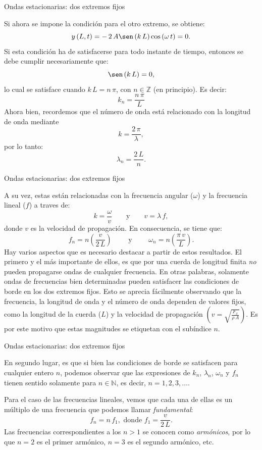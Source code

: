 \documentclass[11pt,handout,aspectratio=1610]{beamer}
\newcommand{\zz}{\mathbb{Z}}
\newcommand{\nn}{\mathbb{N}}
\newcommand{\vs}{\vspace{11pt}}
\begin{document}
\begin{frame}{Ondas estacionarias: dos extremos fijos}   
    
    Si ahora se impone la condición para el otro extremo, se obtiene: $$ y \left(L,t\right) = - \, 2 \, A \sen \left(k \, L\right) \cos \left(\omega \, t\right) = 0. $$ Si esta condición ha de satisfacerse para todo instante de tiempo, entonces se debe cumplir necesariamente que: $$ \sen \left(k \, L\right) = 0, $$ lo cual se satisface cuando $ k \, L = n \, \pi $, con $ n \in \zz $ (en principio). Es decir: $$ k_n = \frac{n \, \pi}{L} $$  Ahora bien, recordemos que el número de onda está relacionado con la longitud de onda mediante $$ k = \frac{2 \, \pi}{\lambda}, $$ por lo tanto: $$ \lambda_n = \frac{2 \, L}{n}. $$
    
\end{frame}

\begin{frame}{Ondas estacionarias: dos extremos fijos}

   A su vez, estas están relacionadas con la frecuencia angular ($\omega$) y la frecuencia lineal ($f$) a traves de: $$ k = \frac{\omega}{v} \qquad \text{y} \qquad v = \lambda \, f, $$ donde $v$ es la velocidad de propagación. En consecuencia, se tiene que: $$ f_n = n \left(\frac{v}{2 \, L}\right) \qquad \text{ y } \qquad \omega_n = n \left(\frac{\pi \, v}{L}\right). $$ Hay varios aspectos que es necesario destacar a partir de estos resultados. El primero y el más importante de ellos, es que por una cuerda de longitud finita \emph{no} pueden propagarse ondas de cualquier frecuencia. En otras palabras, solamente ondas de frecuencias bien determinadas pueden satisfacer las condiciones de borde en los dos extremos fijos. Esto se aprecia fácilmente observando que la frecuencia, la longitud de onda y el número de onda dependen de valores fijos, como la longitud de la cuerda ($L$) y la velocidad de propagación $\left(v = \sqrt{\frac{F_x}{\rho \, A}}\right)$. Es por este motivo que estas magnitudes se etiquetan con el subíndice $n$.
    
\end{frame}

\begin{frame}{Ondas estacionarias: dos extremos fijos}

    En segundo lugar, es que si bien las condiciones de borde se satisfacen para cualquier entero $n$, podemos observar que las expresiones de $k_n$, $\lambda_n$, $\omega_n$ y $f_n$ tienen sentido solamente para $n \in \nn $, es decir, $n = 1, 2, 3, \ldots$.

    \vs 

    Para el caso de las frecuencias lineales, vemos que cada una de ellas es un múltiplo de una frecuencia que podemos llamar \emph{fundamental}: $$ f_n = n \, f_1, \text{ donde } f_1 = \frac{v}{2 \, L}. $$ Las frecuencias correspondientes a los $n > 1$ se conocen como \emph{armónicos}, por lo que $n=2$ es el primer armónico, $n=3$ es el segundo armónico, etc.
    
\end{frame}
\end{document}
